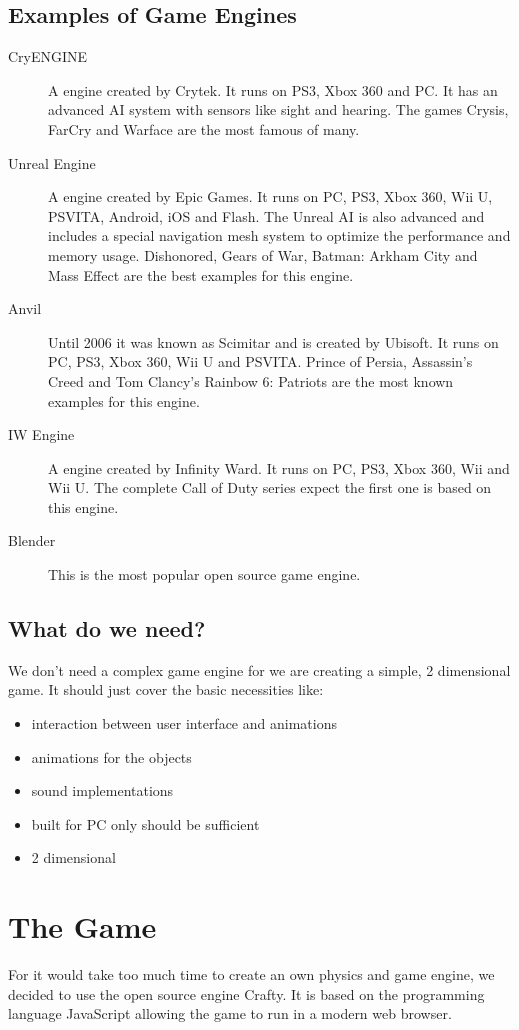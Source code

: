 \documentclass[DIV=calc, paper=a4, fontsize=11pt, twocolumn]{scrreprt}	 %
\begin{document}
        \subsection{Examples of Game Engines}
        \begin{description}
          \item[CryENGINE] A engine created by Crytek. It runs on PS3, Xbox 360 and PC. It has an advanced AI system with sensors like sight and hearing. The games Crysis, FarCry and Warface are the most famous of many.
          \item[Unreal Engine] A engine created by Epic Games. It runs on PC, PS3, Xbox 360, Wii U, PSVITA, Android, iOS and Flash. The Unreal AI is also advanced and includes a special navigation mesh system to optimize the performance and memory usage. Dishonored, Gears of War, Batman: Arkham City and Mass Effect are the best examples for this engine.
          \item[Anvil] Until 2006 it was known as Scimitar and is created by Ubisoft. It runs on PC, PS3, Xbox 360, Wii U and PSVITA. Prince of Persia, Assassin's Creed and Tom Clancy's Rainbow 6: Patriots are the most known examples for this engine.
          \item[IW Engine] A engine created by Infinity Ward. It runs on PC, PS3, Xbox 360, Wii and Wii U. The complete Call of Duty series expect the first one is based on this engine.
          \item[Blender] This is the most popular open source game engine. 
        \end{description}

        \subsection{What do we need?}
        We don't need a complex game engine for we are creating a simple, 2 dimensional game. It should just cover the basic necessities like:
        \begin{itemize}
          \item interaction between user interface and animations
          \item animations for the objects
          \item sound implementations
          \item built for PC only should be sufficient
          \item 2 dimensional
        \end{itemize}
        \newpage
        \section{The Game}
        For it would take too much time to create an own physics and game engine, we decided to use the open source engine Crafty. It is based on the programming language JavaScript allowing the game to run in a modern web browser.
\end{document}
